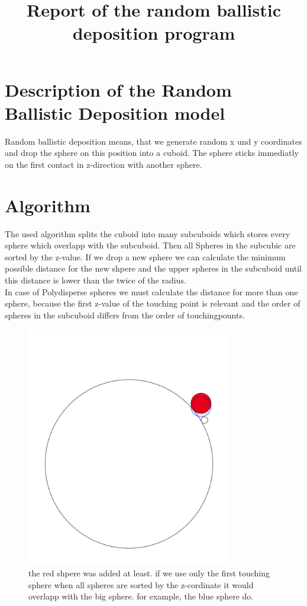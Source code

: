 \documentclass[11pt,a4paper]{article}
\title{Report of the random ballistic deposition program}
\numberwithin{equation}{section}
\begin{document}
\maketitle
\tableofcontents

\section{Description of the Random Ballistic Deposition model}
	Random ballistic deposition means, that we generate random x und y coordinates and drop the sphere on this position into a cuboid. The sphere sticks immediatly on the first contact in z-direction with another sphere.
\section{Algorithm}
	The used algorithm splits the cuboid into many subcuboids which stores every sphere which overlapp with the subcuboid. Then all Spheres in the subcubic are sorted by the z-value. If we drop a new sphere we can calculate the minimum possible distance for the new shpere and the upper spheres in the subcuboid until this distance is lower than the twice of the radius.\\
	In case of Polydisperse spheres we must calculate the distance for more than one sphere, because the first z-value of the touching point is relevant and the order of spheres in the subcuboid differs from the order of touchingpounts.
	\begin{figure}
		\includegraphics[width=9cm]{figures/polydisperse}
		\caption{the red shpere was added at least. if we use only the first touching sphere when all spheres are sorted by the z-cordinate it would overlapp with the big sphere. for example, the blue sphere do.}
	\end{figure}
\end{document}
